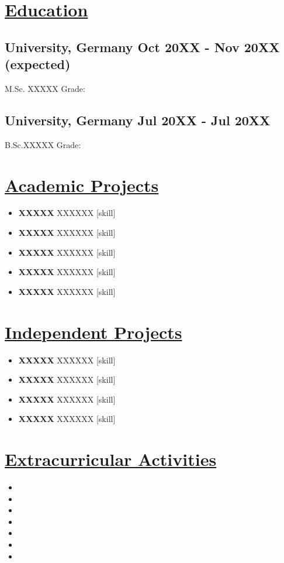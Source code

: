 \documentclass[a4paper,11pt]{article}
\newcommand{\longunderline}[1]{\uline{#1\hfill\mbox{}}}
\begin{document}
\section*{\longunderline{Education}}
    \subsection*{University, Germany \hfill Oct 20XX - Nov 20XX (expected)}
        M.Sc. XXXXX \hfill Grade:
    \subsection*{University, Germany \hfill Jul 20XX - Jul 20XX}
        B.Sc.XXXXX  \hfill Grade: 
        
\section*{\longunderline{Academic Projects}}
    \begin{itemize}[noitemsep,topsep=0pt]
    \item \textbf{XXXXX} XXXXXX \hfill [skill]
    \item \textbf{XXXXX} XXXXXX \hfill [skill]
    \item \textbf{XXXXX} XXXXXX \hfill [skill]
    \item \textbf{XXXXX} XXXXXX \hfill [skill]
    \item \textbf{XXXXX} XXXXXX \hfill [skill]
    \end{itemize}
\section*{\longunderline{Independent Projects}}
    \begin{itemize}[noitemsep,topsep=0pt]
    \item \textbf{XXXXX} XXXXXX \hfill [skill]
    \item \textbf{XXXXX} XXXXXX \hfill [skill]
    \item \textbf{XXXXX} XXXXXX \hfill [skill]
    \item \textbf{XXXXX} XXXXXX \hfill [skill]
    \end{itemize}
\section*{\longunderline{Extracurricular Activities}}
    \begin{itemize}[noitemsep,topsep=0pt]
    \item 
    \item 
    \item 
    \item 
    \item 
    \item 
    \item 
    \end{itemize}
\end{document}
